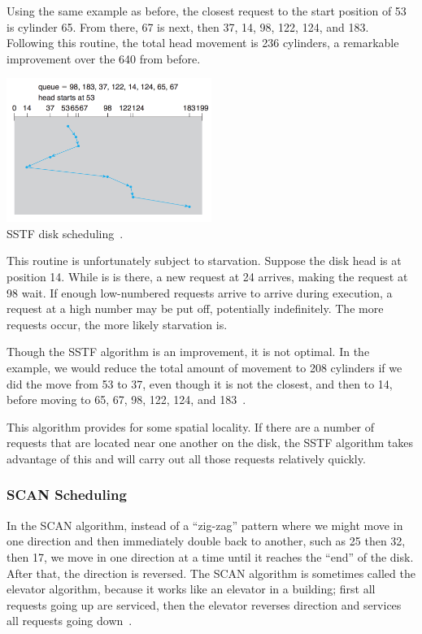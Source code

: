 Using the same example as before, the closest request to the start position of 53 is cylinder 65. From there, 67 is next, then 37, 14, 98, 122, 124, and 183. Following this routine, the total head movement is 236 cylinders, a remarkable improvement over the 640 from before.

\begin{center}
	\includegraphics[width=0.5\textwidth]{images/disk-sstf.png}\\
	SSTF disk scheduling~\cite{osc}.
\end{center}

This routine is unfortunately subject to starvation. Suppose the disk head is at position 14. While is is there, a new request at 24 arrives, making the request at 98 wait. If enough low-numbered requests arrive to arrive during execution, a request at a high number may be put off, potentially indefinitely. The more requests occur, the more likely starvation is.

Though the SSTF algorithm is an improvement, it is not optimal. In the example, we would reduce the total amount of movement to 208 cylinders if we did the move from 53 to 37, even though it is not the closest, and then to 14, before moving to 65, 67, 98, 122, 124, and 183~\cite{osc}.

This algorithm provides for some spatial locality. If there are a number of requests that are located near one another on the disk, the SSTF algorithm takes advantage of this and will carry out all those requests relatively quickly.

\subsubsection*{SCAN Scheduling}
In the SCAN algorithm, instead of a ``zig-zag'' pattern where we might move in one direction and then immediately double back to another, such as 25 then 32, then 17, we move in one direction at a time until it reaches the ``end'' of the disk. After that, the direction is reversed. The SCAN algorithm is sometimes called the elevator algorithm, because it works like an elevator in a building; first all requests going up are serviced, then the elevator reverses direction and services all requests going down~\cite{osc}.

